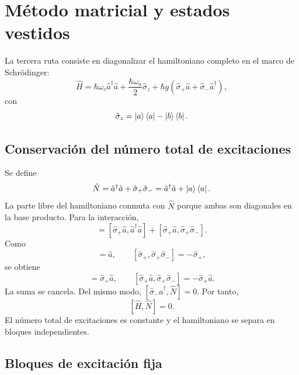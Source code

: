 \documentclass[11pt]{article}
\newcommand{\adag}{\hat a^\dagger}
\newcommand{\sigmap}{\hat\sigma_+}
\newcommand{\sigmam}{\hat\sigma_-}
\begin{document}
\section{M\'etodo matricial y estados vestidos}

La tercera ruta consiste en diagonalizar el hamiltoniano completo en el marco
de Schr\"odinger:
\begin{equation}
  \hat H
  =
  \hbar\omega_c\adag\hat a
  +
  \frac{\hbar\omega_a}{2}\hat\sigma_z
  +
  \hbar g
  \left(\sigmap\hat a+\sigmam\adag\right),
\end{equation}
con
\begin{equation}
  \hat\sigma_z=\ket{a}\bra{a}-\ket{b}\bra{b}.
\end{equation}

\subsection{Conservaci\'on del n\'umero total de excitaciones}

Se define
\begin{equation}
  \hat N
  =
  \adag\hat a+\sigmap\sigmam
  =
  \adag\hat a+\ket{a}\bra{a}.
\end{equation}
La parte libre del hamiltoniano conmuta con $\hat N$ porque ambas son
diagonales en la base producto. Para la interacci\'on,
\begin{equation}
  [\sigmap\hat a,\hat N]
  =
  [\sigmap\hat a,\adag\hat a]
  +
  [\sigmap\hat a,\sigmap\sigmam].
\end{equation}
Como
\begin{equation}
  [\hat a,\adag\hat a]=\hat a,
  \qquad
  [\sigmap,\sigmap\sigmam]=-\sigmap,
\end{equation}
se obtiene
\begin{equation}
  [\sigmap\hat a,\adag\hat a]=\sigmap\hat a,
  \qquad
  [\sigmap\hat a,\sigmap\sigmam]=-\sigmap\hat a.
\end{equation}
La suma se cancela. Del mismo modo,
$[\sigmam\adag,\hat N]=0$. Por tanto,
\begin{equation}
  \boxed{[\hat H,\hat N]=0.}
\end{equation}
El n\'umero total de excitaciones es constante y el hamiltoniano se separa en
bloques independientes.

\subsection{Bloques de excitaci\'on fija}
\end{document}
